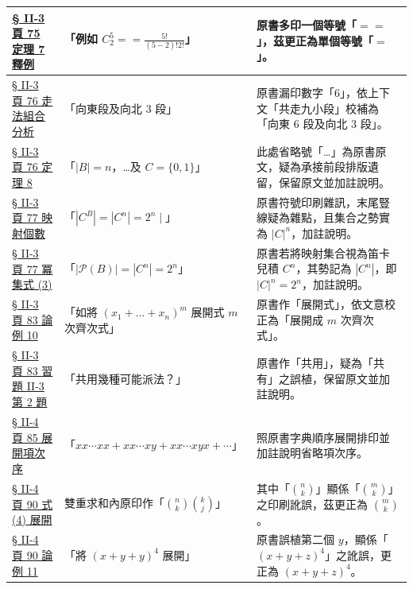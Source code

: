 \documentclass[a4paper,12pt,twoside]{article}
\begin{document}
\begin{xltabular}{\textwidth}{|p{3.2cm}|p{3.8cm}|X|}
\hyperref[note:b5s-ch2-p75-eq]{§ II-3 頁 75 定理 7 釋例} & 
「例如 $C_2^5 == \frac{5!}{(5-2)! 2!}$」 & 
原書多印一個等號「$==$」，茲更正為單個等號「$=$」。 \\ \hline

\hyperref[note:b5s-ch2-p76-east6]{§ II-3 頁 76 走法組合分析} & 
「向東段及向北 3 段」 & 
原書漏印數字「6」，依上下文「共走九小段」校補為「向東 6 段及向北 3 段」。 \\ \hline

\hyperref[note:b5s-ch2-p76-thm8-dots]{§ II-3 頁 76 定理 8} & 
「$|B| = n$，\dots 及 $C = \{0, 1\}$」 & 
此處省略號「\dots」為原書原文，疑為承接前段排版遺留，保留原文並加註說明。 \\ \hline

\hyperref[note:b5s-ch2-p77-cb]{§ II-3 頁 77 映射個數} & 
「$|C^B| = |C^n| = 2^n \mid$」 & 
原書符號印刷雜訊，末尾豎線疑為雜點，且集合之勢實為 $|C|^n$，加註說明。 \\ \hline

\hyperref[note:b5s-ch2-p77-pn]{§ II-3 頁 77 冪集式 (3)} & 
「$|\mathscr{P}(B)| = |C^n| = 2^n$」 & 
原書若將映射集合視為笛卡兒積 $C^n$，其勢記為 $|C^n|$，即 $|C|^n = 2^n$，加註說明。 \\ \hline

\hyperref[note:b5s-ch2-p83-zhankai]{§ II-3 頁 83 論例 10} & 
「如將 $(x_1 + \dots + x_n)^m$ 展開式 $m$ 次齊次式」 & 
原書作「展開式」，依文意校正為「展開成 $m$ 次齊次式」。 \\ \hline

\hyperref[note:b5s-ch2-p83-gongyong]{§ II-3 頁 83 習題 II-3 第 2 題} & 
「共用幾種可能派法？」 & 
原書作「共用」，疑為「共有」之誤植，保留原文並加註說明。 \\ \hline

\hyperref[note:b5s-ch2-p85-expand]{§ II-4 頁 85 展開項次序} & 
「$xx\cdots xx + xx\cdots xy + xx\cdots xyx + \cdots$」 & 
照原書字典順序展開排印並加註說明省略項次序。 \\ \hline

\hyperref[note:b5s-ch2-p90-binom]{§ II-4 頁 90 式 (4) 展開} & 
雙重求和內原印作「$\binom{n}{k} \binom{k}{j}$」 & 
其中「$\binom{n}{k}$」顯係「$\binom{m}{k}$」之印刷訛誤，茲更正為 $\binom{m}{k}$。 \\ \hline

\hyperref[note:b5s-ch2-p90-ex11-typo]{§ II-4 頁 90 論例 11} & 
「將 $(x+y+y)^4$ 展開」 & 
原書誤植第二個 $y$，顯係「$(x+y+z)^4$」之訛誤，更正為 $(x+y+z)^4$。 \\ \hline


\end{xltabular}
\end{document}
